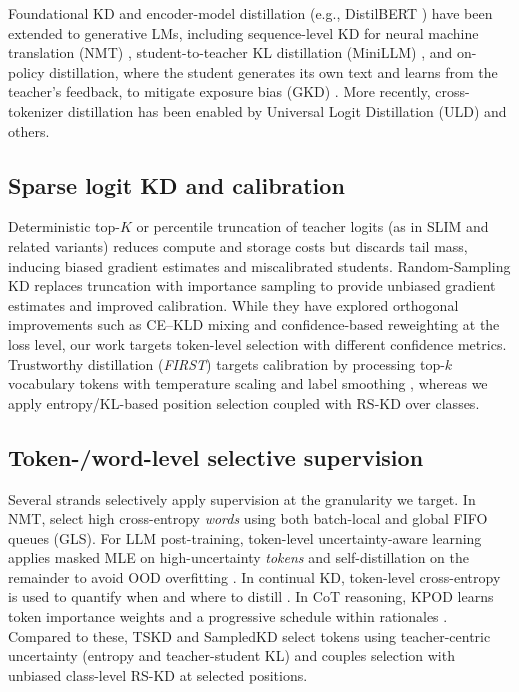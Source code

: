 \documentclass[11pt]{article}
\begin{document}
Foundational KD \citep{hinton2015distillation} and encoder-model distillation (e.g., DistilBERT \citep{sanh2019distilbert}) have been extended to generative LMs, including sequence-level KD for neural machine translation (NMT) \citep{kim2016sequencekd}, student-to-teacher KL distillation (MiniLLM) \citep{gu2023minillm}, and on-policy distillation, where the student generates its own text and learns from the teacher's feedback, to mitigate exposure bias (GKD) \citep{agarwal2024gkd}.
More recently, cross-tokenizer distillation has been enabled by Universal Logit Distillation (ULD) \citep{boizard2024uld} and others.

\subsection{Sparse logit KD and calibration}
Deterministic top-$K$ or percentile truncation of teacher logits (as in SLIM \citep{raman2023slim} and related variants) reduces compute and storage costs but discards tail mass, inducing biased gradient estimates and miscalibrated students.
Random-Sampling KD \citep{anshumann2025sparse} replaces truncation with importance sampling to provide unbiased gradient estimates and improved calibration.
While they have explored orthogonal improvements such as CE--KLD mixing and confidence-based reweighting at the loss level, our work targets token-level selection with different confidence metrics.
Trustworthy distillation (\emph{FIRST}) targets calibration by processing top-$k$ vocabulary tokens with temperature scaling and label smoothing \citep{shum2024first}, whereas we apply entropy/KL-based position selection coupled with RS-KD over classes.

\subsection{Token-/word-level selective supervision} Several strands selectively apply supervision at the granularity we target. In NMT, \citet{wang2021selectivekd} select high cross-entropy \emph{words} using both batch-local and global FIFO queues (GLS). For LLM post-training, token-level uncertainty-aware learning applies masked MLE on high-uncertainty \emph{tokens} and self-distillation on the remainder to avoid OOD overfitting \citep{liu2025tokenlevel}. In continual KD, token-level cross-entropy is used to quantify when and where to distill \citep{zhang2023continualkd}. In CoT reasoning, KPOD learns token importance weights and a progressive schedule within rationales \citep{feng2024kpod}.
Compared to these, TSKD and SampledKD select tokens using teacher-centric uncertainty (entropy and teacher-student KL) and couples selection with unbiased class-level RS-KD at selected positions.
\end{document}
